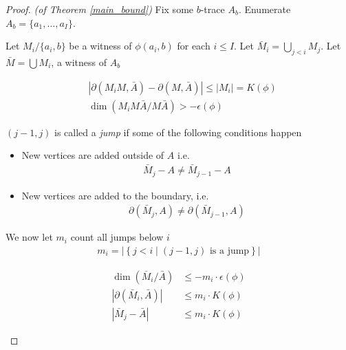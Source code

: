 \documentclass{amsart}
\newcommand{\curly}[1]{\left\{#1\right\}}
\newcommand{\abs}[1]{\left|#1\right|}
\begin{document}
\begin{proof} \textit{(of Theorem \ref{main_bound})}
	Fix some $b$-trace $A_b$. Enumerate $A_b = \{a_1, \ldots, a_I\}$.

	Let $M_i / \{a_i, b\}$ be a witness of $\phi(a_i, b)$ for each $i \leq I$.
	Let $\bar M_i = \bigcup_{j < i} M_j$.
	Let $\bar M = \bigcup M_i$, a witness of $A_b$
	
	\begin{Claim}
		\begin{align*}
			&\abs{\partial(M_i M, \bar A) - \partial(M, \bar A)} \leq |M_i| = K(\phi)\\
			&\dim(M_i M \bar A / M \bar A) > -\epsilon(\phi)
		\end{align*}
	\end{Claim}
	
	\begin{Definition}
		$(j-1, j)$ is called a \emph{jump} if some of the following conditions happen
		\begin{itemize}
			\item New vertices are added outside of $A$ i.e.
				\begin{align*}
					\bar M_j - A \neq \bar M_{j-1} - A
				\end{align*}
			\item New vertices are added to the boundary, i.e.
				\begin{align*}
					\partial(\bar M_j, A) \neq \partial(\bar M_{j-1}, A)
				\end{align*}
		\end{itemize}
	\end{Definition}

	\begin{Definition}
		We now let $m_i$ count all jumps below $i$
		\begin{align*}
			m_i = \abs{\curly{j < i \mid (j-1, j) \text{ is a jump}}}
		\end{align*}
	\end{Definition}

	\begin{Lemma} \label{ub_lemma}
		\begin{align*}
			\dim(\bar M_i / \bar A) &\leq -m_i \cdot \epsilon(\phi) \\
			|\partial(\bar M_i, \bar A)| &\leq m_i \cdot K(\phi) \\
			|\bar M_j - \bar A| &\leq m_i \cdot K(\phi)
		\end{align*}
	\end{Lemma}


\end{proof}
\end{document}
